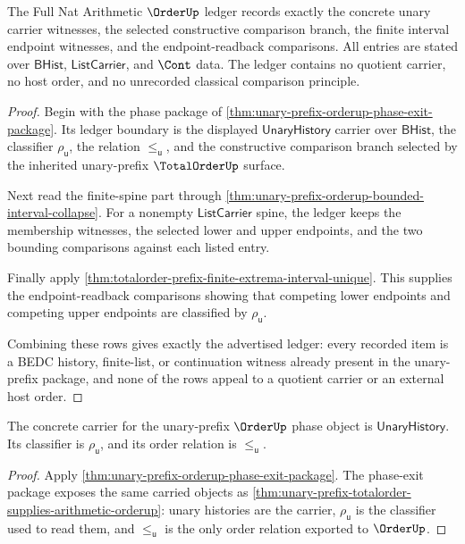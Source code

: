 \begin{theorem}
\label{thm:unary-prefix-orderup-ledger-obligation}
The Full Nat Arithmetic $\OrderUp$ ledger records exactly the concrete unary
carrier witnesses, the selected constructive comparison branch, the finite
interval endpoint witnesses, and the endpoint-readback comparisons. All entries
are stated over $\mathsf{BHist}$, $\mathsf{ListCarrier}$, and $\Cont$ data. The
ledger contains no quotient carrier, no host order, and no unrecorded classical
comparison principle.
\end{theorem}
\begin{proof}
Begin with the phase package of
\autoref{thm:unary-prefix-orderup-phase-exit-package}. Its ledger boundary is
the displayed $\mathsf{UnaryHistory}$ carrier over $\mathsf{BHist}$, the
classifier $\rho_{\mathsf{u}}$, the relation $\le_{\mathsf{u}}$, and the
constructive comparison branch selected by the inherited unary-prefix
$\TotalOrderUp$ surface.

Next read the finite-spine part through
\autoref{thm:unary-prefix-orderup-bounded-interval-collapse}. For a nonempty
$\mathsf{ListCarrier}$ spine, the ledger keeps the membership witnesses, the
selected lower and upper endpoints, and the two bounding comparisons against
each listed entry.

Finally apply
\autoref{thm:totalorder-prefix-finite-extrema-interval-unique}. This supplies
the endpoint-readback comparisons showing that competing lower endpoints and
competing upper endpoints are classified by $\rho_{\mathsf{u}}$.

Combining these rows gives exactly the advertised ledger: every recorded item is
a BEDC history, finite-list, or continuation witness already present in the
unary-prefix package, and none of the rows appeal to a quotient carrier or an
external host order.
\end{proof}

\begin{theorem}
\label{thm:orderup-carrier-classifier-obligation}
The concrete carrier for the unary-prefix $\OrderUp$ phase object is
$\mathsf{UnaryHistory}$. Its classifier is $\rho_{\mathsf{u}}$, and its order
relation is $\le_{\mathsf{u}}$.
\end{theorem}
\begin{proof}
Apply \autoref{thm:unary-prefix-orderup-phase-exit-package}. The phase-exit
package exposes the same carried objects as
\autoref{thm:unary-prefix-totalorder-supplies-arithmetic-orderup}: unary
histories are the carrier, $\rho_{\mathsf{u}}$ is the classifier used to read
them, and $\le_{\mathsf{u}}$ is the only order relation exported to
$\OrderUp$.
\end{proof}

